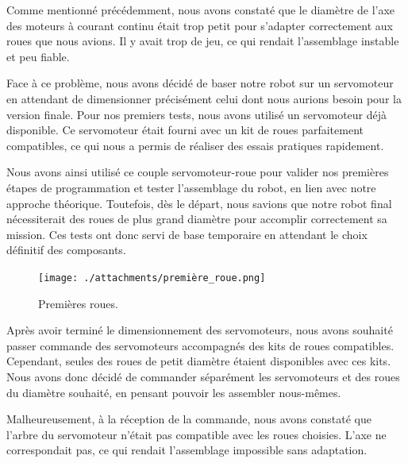 \documentclass[a4paper,12pt]{report}  %
\begin{document}
Comme mentionné précédemment, nous avons constaté que le diamètre de l’axe des moteurs à courant continu était trop petit pour s’adapter correctement aux roues que nous avions. Il y avait trop de jeu, ce qui rendait l’assemblage instable et peu fiable.

Face à ce problème, nous avons décidé de baser notre robot sur un servomoteur en attendant de dimensionner précisément celui dont nous aurions besoin pour la version finale. Pour nos premiers tests, nous avons utilisé un servomoteur déjà disponible. Ce servomoteur était fourni avec un kit de roues parfaitement compatibles, ce qui nous a permis de réaliser des essais pratiques rapidement.

Nous avons ainsi utilisé ce couple servomoteur-roue pour valider nos premières étapes de programmation et tester l’assemblage du robot, en lien avec notre approche théorique. Toutefois, dès le départ, nous savions que notre robot final nécessiterait des roues de plus grand diamètre pour accomplir correctement sa mission. Ces tests ont donc servi de base temporaire en attendant le choix définitif des composants.

\begin{figure}[H]
	\centering
	\texttt{[image: ./attachments/première\_roue.png]}
	\caption{Premières roues.}
\end{figure}

Après avoir terminé le dimensionnement des servomoteurs, nous avons souhaité passer commande des servomoteurs accompagnés des kits de roues compatibles. Cependant, seules des roues de petit diamètre étaient disponibles avec ces kits. Nous avons donc décidé de commander séparément les servomoteurs et des roues du diamètre souhaité, en pensant pouvoir les assembler nous-mêmes.

Malheureusement, à la réception de la commande, nous avons constaté que l’arbre du servomoteur n’était pas compatible avec les roues choisies. L’axe ne correspondait pas, ce qui rendait l’assemblage impossible sans adaptation.
\end{document}
